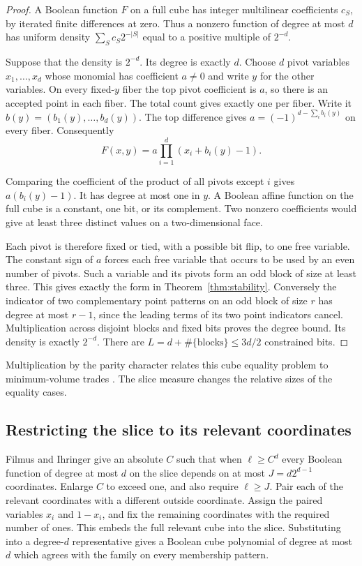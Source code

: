\documentclass[11pt,letterpaper]{article}
\numberwithin{equation}{section}
\begin{document}
\begin{proof}

A Boolean function $F$ on a full cube has integer multilinear coefficients $c_S$, by iterated
finite differences at zero. Thus a nonzero function of degree at most $d$ has uniform density
$\sum_S c_S2^{-|S|}$ equal to a positive multiple of $2^{-d}$.

Suppose that the density is $2^{-d}$. Its degree is exactly $d$. Choose $d$ pivot variables
$x_1,\ldots,x_d$ whose monomial has coefficient $a\ne0$ and write $y$ for the other variables.
On every fixed-$y$ fiber the top pivot coefficient is $a$, so there is an accepted point in
each fiber. The total count gives exactly one per fiber. Write it
$b(y)=(b_1(y),\ldots,b_d(y))$. The top difference gives $a=(-1)^{d-\sum_i b_i(y)}$ on every
fiber. Consequently
\[
F(x,y)=a\prod_{i=1}^d(x_i+b_i(y)-1).
\]

Comparing the coefficient of the product of all pivots except $i$ gives $a(b_i(y)-1)$. It has
degree at most one in $y$. A Boolean affine function on the full cube is a constant, one bit,
or its complement. Two nonzero coefficients would give at least three distinct values on a
two-dimensional face.

Each pivot is therefore fixed or tied, with a possible bit flip, to one free variable. The
constant sign of $a$ forces each free variable that occurs to be used by an even number of
pivots. Such a variable and its pivots form an odd block of size at least three. This gives
exactly the form in Theorem~\ref{thm:stability}. Conversely the indicator of two complementary
point patterns on an odd block of size $r$ has degree at most $r-1$, since the leading terms
of its two point indicators cancel. Multiplication across disjoint blocks and fixed bits
proves the degree bound. Its density is exactly $2^{-d}$. There are
$L=d+\#\{\text{blocks}\}\le3d/2$ constrained bits.
\end{proof}

Multiplication by the parity character relates this cube equality problem to minimum-volume
trades \cite{trades}. The slice measure changes the relative sizes of the equality cases.

\subsection{Restricting the slice to its relevant coordinates}\label{sec:junta}

Filmus and Ihringer \cite[Theorem 1.1]{fi} give an absolute $C$ such that when $\ell\ge C^d$ every
Boolean function of degree at most $d$ on the slice depends on at most $J=d2^{d-1}$
coordinates. Enlarge $C$ to exceed one, and also require $\ell\ge J$. Pair each of the
relevant coordinates with a different outside coordinate. Assign the paired variables $x_i$
and $1-x_i$, and fix the remaining coordinates with the required number of ones. This embeds
the full relevant cube into the slice. Substituting into a degree-$d$ representative gives a
Boolean cube polynomial of degree at most $d$ which agrees with the family on every membership
pattern.
\end{document}
